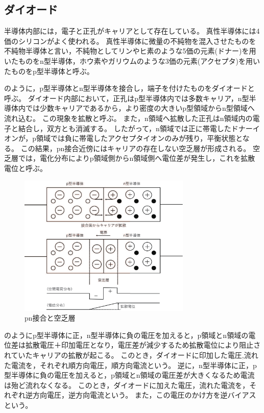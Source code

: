 \subsection{ダイオード}
半導体内部には，電子と正孔がキャリアとして存在している。
真性半導体には4価のシリコンがよく使われる。
真性半導体に微量の不純物を混入させたものを不純物半導体と言い，不純物としてリンやヒ素のような5価の元素(ドナー)を用いたものをn型半導体，ホウ素やガリウムのような3価の元素(アクセプタ)を用いたものをp型半導体と呼ぶ。

のように，p型半導体とn型半導体を接合し，端子を付けたものをダイオードと呼ぶ。
ダイオード内部において，正孔はp型半導体内では多数キャリア，n型半導体内では少数キャリアであるから，より密度の大きいp型領域からn型領域へ流れ込む。
この現象を拡散と呼ぶ。
また，n領域へ拡散した正孔はn領域内の電子と結合し，双方とも消滅する。
したがって，n領域では正に帯電したドナーイオンが，p領域では負に帯電したアクセプタイオンのみが残り，平衡状態となる。
この結果，pn接合近傍にはキャリアの存在しない空乏層が形成される。
空乏層では，電化分布によりp領域側からn領域側へ電位差が発生し，これを拡散電位と呼ぶ。

\begin{figure}[!h]
 \centering
 \includegraphics[width=8.2cm]{./pdfs/fig1.pdf}
 \caption{pn接合と空乏層}
 \label{fig:fig1}
\end{figure}%

のようにp型半導体に正，n型半導体に負の電圧を加えると，p領域とn領域の電位差は拡散電圧＋印加電圧となり，電圧差が減少するため拡散電位により阻止されていたキャリアの拡散が起こる。
このとき，ダイオードに印加した電圧,流れた電流を，それぞれ順方向電圧，順方向電流という。
逆に，n型半導体に正，p型半導体に負の電圧を加えると，p領域とn領域の電圧差が大きくなるため電流は殆ど流れなくなる。
このとき，ダイオードに加えた電圧，流れた電流を，それぞれ逆方向電圧，逆方向電流という。
また，この電圧のかけ方を逆バイアスという。

